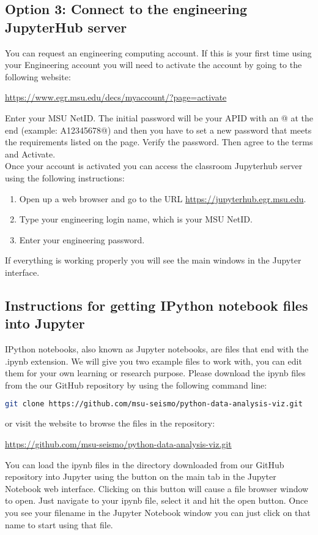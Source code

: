 \documentclass[12pt]{article}   	%
\begin{document}
\subsection*{Option 3: Connect to the engineering JupyterHub server}
You can request an engineering computing account. If this is your first time using your Engineering account you will need to activate the account by
going to the following website: 
\begin{center}
\href{https://www.egr.msu.edu/decs/myaccount/?page=activate}{https://www.egr.msu.edu/decs/myaccount/?page=activate} 
\end{center}
Enter your MSU NetID. The initial password will be your APID with an @ at the end (example: A12345678@) and then you have to set a new password that meets the
requirements listed on the page. Verify the password. Then agree to the terms and Activate. \\ 
Once your account is activated you can access the classroom Jupyterhub server using the following instructions:
\begin{enumerate}[noitemsep]
\item Open up a web browser and go to the URL \href{https://jupyterhub.egr.msu.edu}{https://jupyterhub.egr.msu.edu}.
\item Type your engineering login name, which is your MSU NetID.
\item Enter your engineering password.
\end{enumerate}
If everything is working properly you will see the main  windows in the Jupyter interface.


\subsection*{Instructions for getting IPython notebook files into Jupyter}
IPython notebooks, also known as Jupyter notebooks, are files that end with the .ipynb extension. We will give you two example files to work with, you can edit them for your own learning or research 
purpose. Please download the ipynb files from the our GitHub repository by using the following command line: \\
\begin{lstlisting}[language=bash,keywordstyle=\color{blue!70},basicstyle=\ttfamily]
git clone https://github.com/msu-seismo/python-data-analysis-viz.git
\end{lstlisting}

or visit the website to browse the files in the repository: 
\begin{center}
\href{https://github.com/msu-seismo/python-data-analysis-viz.git}{https://github.com/msu-seismo/python-data-analysis-viz.git} \\
\end{center}
You can load the ipynb files in the directory downloaded from our GitHub repository into Jupyter using the
 button on the main  tab in the Jupyter Notebook web interface. Clicking on this button will
cause a file browser window to open. Just navigate to your ipynb file, select it and hit the
open button. Once you see your filename in the Jupyter Notebook window you can just click on that
name to start using that file. 
\end{document}
